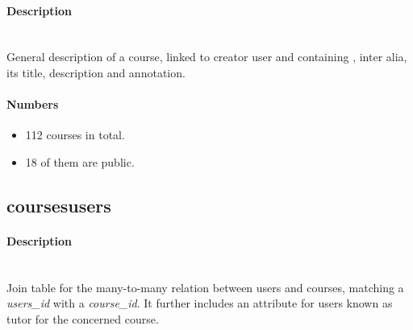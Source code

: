 \paragraph{Description}~\\ %
General description of a course, linked to creator user and containing , inter alia, its title, description and annotation.

\paragraph{Numbers} %
\begin{itemize}
	\setlength\itemsep{0em}
	\item 112 courses in total.
	\item 18 of them are public.
\end{itemize}


\subsection{coursesusers} %
\begin{figure}
  \vspace{-20pt}
  \begin{center}
  \end{center}
  \vspace{-20pt}
\end{figure}

\paragraph{Description}~\\ %
Join table for the many-to-many relation between users and courses, matching a \emph{users\_id} with a \emph{course\_id}. It further includes an attribute for users known as tutor for the concerned course.



